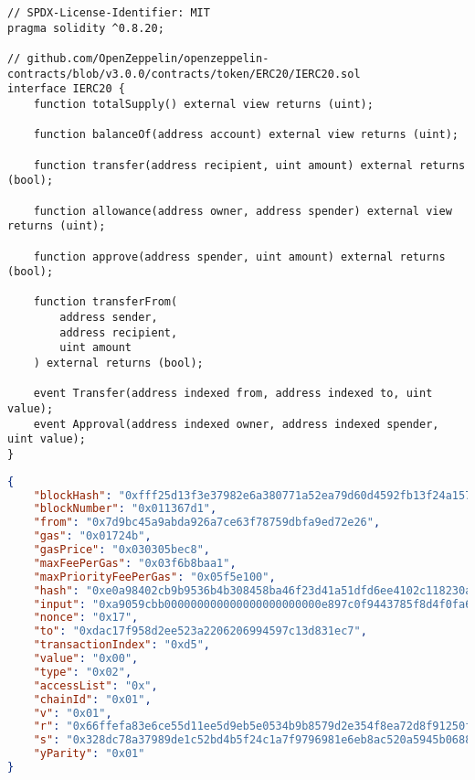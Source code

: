 \backgroundtitlevisiblefalse

\begin{fullwidth}
\begin{lstlisting}[language=Solidity]
// SPDX-License-Identifier: MIT
pragma solidity ^0.8.20;

// github.com/OpenZeppelin/openzeppelin-contracts/blob/v3.0.0/contracts/token/ERC20/IERC20.sol
interface IERC20 {
    function totalSupply() external view returns (uint);

    function balanceOf(address account) external view returns (uint);

    function transfer(address recipient, uint amount) external returns (bool);

    function allowance(address owner, address spender) external view returns (uint);

    function approve(address spender, uint amount) external returns (bool);

    function transferFrom(
        address sender,
        address recipient,
        uint amount
    ) external returns (bool);

    event Transfer(address indexed from, address indexed to, uint value);
    event Approval(address indexed owner, address indexed spender, uint value);
}
\end{lstlisting}
\end{fullwidth}

\begin{fullwidth}
\begin{lstlisting}[language=Json]
{
    "blockHash": "0xfff25d13f3e37982e6a380771a52ea79d60d4592fb13f24a157a96bd48cb823a",
    "blockNumber": "0x011367d1",
    "from": "0x7d9bc45a9abda926a7ce63f78759dbfa9ed72e26",
    "gas": "0x01724b",
    "gasPrice": "0x030305bec8",
    "maxFeePerGas": "0x03f6b8baa1",
    "maxPriorityFeePerGas": "0x05f5e100",
    "hash": "0xe0a98402cb9b9536b4b308458ba46f23d41a51dfd6ee4102c118230a44529cbd",
    "input": "0xa9059cbb000000000000000000000000e897c0f9443785f8d4f0fa6e...",
    "nonce": "0x17",
    "to": "0xdac17f958d2ee523a2206206994597c13d831ec7",
    "transactionIndex": "0xd5",
    "value": "0x00",
    "type": "0x02",
    "accessList": "0x",
    "chainId": "0x01",
    "v": "0x01",
    "r": "0x66ffefa83e6ce55d11ee5d9eb5e0534b9b8579d2e354f8ea72d8f91250fc5893",
    "s": "0x328dc78a37989de1c52bd4b5f24c1a7f9796981e6eb8ac520a5945b06888fef4",
    "yParity": "0x01"
}
\end{lstlisting}
\end{fullwidth}
